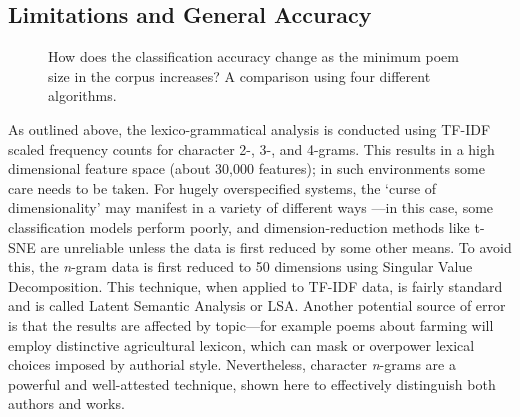 \documentclass[twocolumn, switch, a4paper]{article} %
\begin{document}
\subsection{Limitations and General Accuracy}
\label{sec: ngram_acc}

\begin{figure}
  \caption{How does the classification accuracy change as the minimum poem
  size in the corpus increases? A comparison using four different algorithms.}
  \label{fig:ngram_acc}
  \centering
  \qquad
\end{figure}

As outlined above, the lexico-grammatical analysis is conducted using TF-IDF
scaled frequency counts for character 2-, 3-, and 4-grams. This results in a
high dimensional feature space (about 30,000 features); in such environments
some care needs to be taken. For hugely overspecified systems, the `curse of
dimensionality' may manifest in a variety of different ways
\cite{zimek_etal}---in this case, some classification models perform poorly,
and dimension-reduction methods like t-SNE are unreliable unless the data is
first reduced by some other means. To avoid this, the \emph{n}-gram data is
first reduced to 50 dimensions using Singular Value Decomposition. This
technique, when applied to TF-IDF data, is fairly standard and is called
Latent Semantic Analysis or LSA. Another potential source of error is that the
results are affected by topic---for example poems about farming will employ
distinctive agricultural lexicon, which can mask or overpower lexical choices
imposed by authorial style. Nevertheless, character \emph{n}-grams are a
powerful and well-attested technique, shown here to effectively distinguish
both authors and works.
\end{document}
